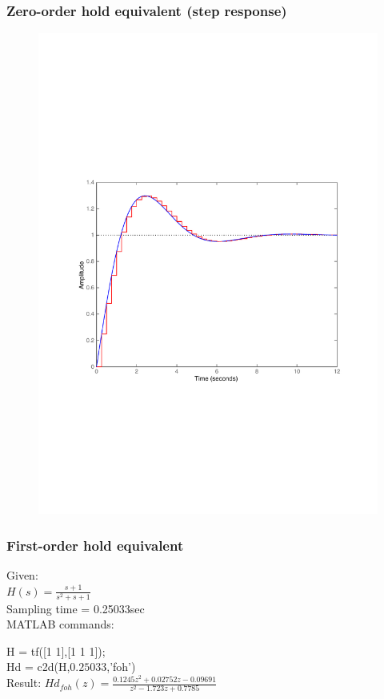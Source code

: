 \begin{frame}
	\frametitle{Zero-order hold equivalent (step response)}
	\vspace{-0.7em}
	\begin{figure}
		\centering
		\includegraphics[width=0.8\linewidth]{vb1}
	\end{figure}
\end{frame}

\begin{frame}
	\frametitle{First-order hold equivalent}
	\begin{example}
		Given:\\
		$H(s) = \frac{s + 1}{s^{2} + s + 1}$\\
		Sampling time = 0.25033sec\\
		\vspace{1em}
		MATLAB commands:
	
		H = tf([1 1],[1 1 1]); \\
		Hd = c2d(H,$0.25033$,'foh')\\
		\vspace{1em}
		Result:
		$Hd_{foh}(z) = \frac{0.1245z^{2} + 0.02752z - 0.09691}{z^{2} - 1.723z + 0.7785}$
	\end{example}
\end{frame}

